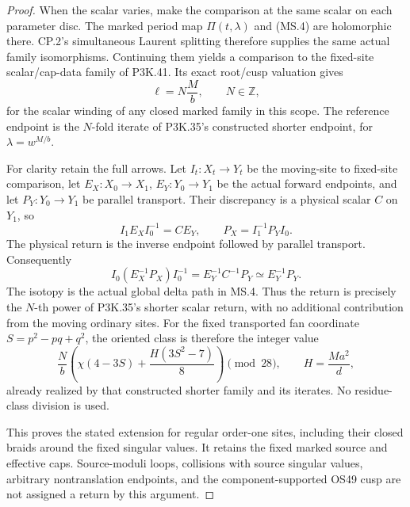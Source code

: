 \begin{proof}
When the scalar varies, make the comparison at the same scalar on
each parameter disc. The marked period map \(\Pi(t,\lambda)\)
and (MS.4) are holomorphic there. CP.2's simultaneous Laurent splitting
therefore supplies the same actual family isomorphisms. Continuing
them yields a comparison to the fixed-site scalar/cap-data family of
P3K.41. Its exact root/cusp valuation gives
\[
                     \ell=N\frac{M}{b},\qquad N\in\mathbb Z,
                                                               \tag{MS.9}
\]
for the scalar winding of any closed marked family in this scope.
The reference endpoint is the \(N\)-fold iterate of P3K.35's
constructed shorter endpoint, for \(\lambda=w^{M/b}\).

For clarity retain the full arrows. Let \(I_t:X_t\to Y_t\)
be the moving-site to fixed-site comparison, let
\(E_X:X_0\to X_1\), \(E_Y:Y_0\to Y_1\) be the actual
forward endpoints, and let \(P_Y:Y_0\to Y_1\) be parallel
transport. Their discrepancy is a physical scalar \(C\) on
\(Y_1\), so
\[
 I_1E_XI_0^{-1}=C E_Y,\qquad
 P_X=I_1^{-1}P_YI_0.
\]
The physical return is the inverse endpoint followed by parallel
transport. Consequently
\[
 I_0(E_X^{-1}P_X)I_0^{-1}
       =E_Y^{-1}C^{-1}P_Y
       \simeq E_Y^{-1}P_Y.                                \tag{MS.10}
\]
The isotopy is the actual global delta path in MS.4. Thus the return
is precisely the \(N\)-th power of P3K.35's shorter scalar return,
with no additional contribution from the moving ordinary sites.
For the fixed transported fan coordinate \(S=p^2-pq+q^2\), the
oriented class is therefore the integer value
\[
 \frac{N}{b}\left(\chi(4-3S)+\frac{H(3S^2-7)}8\right)
            \pmod {28},\qquad H=\frac{Ma^2}{d},           \tag{MS.11}
\]
already realized by that constructed shorter family and its iterates.
No residue-class division is used.

This proves the stated extension for regular order-one sites, including
their closed braids around the fixed singular values. It retains the
fixed marked source and effective caps. Source-moduli loops,
collisions with source singular values, arbitrary nontranslation
endpoints, and the component-supported OS49 cusp are not assigned a
return by this argument.

\end{proof}
